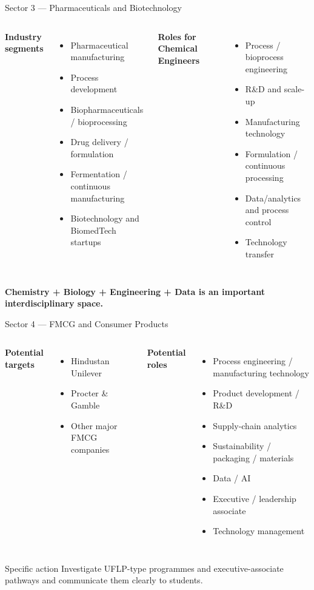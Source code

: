 \documentclass[aspectratio=169,11pt]{beamer}
\newcommand{\key}[1]{\textbf{\color{IITblue}#1}}
\begin{document}
\begin{frame}{Sector 3 — Pharmaceuticals and Biotechnology}
\begin{columns}[T]
\textbf{Industry segments}
\begin{itemize}
\item Pharmaceutical manufacturing
\item Process development
\item Biopharmaceuticals / bioprocessing
\item Drug delivery / formulation
\item Fermentation / continuous manufacturing
\item Biotechnology and BiomedTech startups
\end{itemize}
\textbf{Roles for Chemical Engineers}
\begin{itemize}
\item Process / bioprocess engineering
\item R\&D and scale-up
\item Manufacturing technology
\item Formulation / continuous processing
\item Data/analytics and process control
\item Technology transfer
\end{itemize}
\end{columns}
\vspace{3mm}
\centering\key{Chemistry + Biology + Engineering + Data is an important interdisciplinary space.}
\end{frame}

\begin{frame}{Sector 4 — FMCG and Consumer Products}
\begin{columns}[T]
\textbf{Potential targets}
\begin{itemize}
\item Hindustan Unilever
\item Procter \& Gamble
\item Other major FMCG companies
\end{itemize}
\textbf{Potential roles}
\begin{itemize}
\item Process engineering / manufacturing technology
\item Product development / R\&D
\item Supply-chain analytics
\item Sustainability / packaging / materials
\item Data / AI
\item Executive / leadership associate
\item Technology management
\end{itemize}
\end{columns}
\vspace{4mm}
\begin{block}{Specific action}
Investigate UFLP-type programmes and executive-associate pathways and communicate them clearly to students.
\end{block}
\end{frame}
\end{document}
